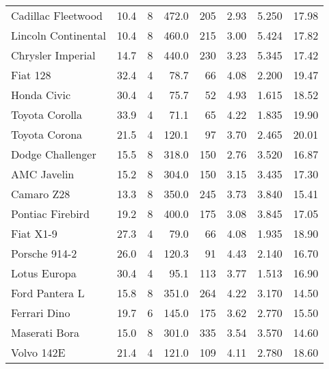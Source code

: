\documentclass[]{book}
\begin{document}
\begin{ThreePartTable}
\begin{longtable}{lrrrrrrr}
Cadillac Fleetwood & 10.4 & 8 & 472.0 & 205 & 2.93 & 5.250 & 17.98\\
Lincoln Continental & 10.4 & 8 & 460.0 & 215 & 3.00 & 5.424 & 17.82\\
Chrysler Imperial & 14.7 & 8 & 440.0 & 230 & 3.23 & 5.345 & 17.42\\
Fiat 128 & 32.4 & 4 & 78.7 & 66 & 4.08 & 2.200 & 19.47\\
\midrule
Honda Civic & 30.4 & 4 & 75.7 & 52 & 4.93 & 1.615 & 18.52\\
Toyota Corolla & 33.9 & 4 & 71.1 & 65 & 4.22 & 1.835 & 19.90\\
Toyota Corona & 21.5 & 4 & 120.1 & 97 & 3.70 & 2.465 & 20.01\\
Dodge Challenger & 15.5 & 8 & 318.0 & 150 & 2.76 & 3.520 & 16.87\\
AMC Javelin & 15.2 & 8 & 304.0 & 150 & 3.15 & 3.435 & 17.30\\
Camaro Z28 & 13.3 & 8 & 350.0 & 245 & 3.73 & 3.840 & 15.41\\
\midrule
Pontiac Firebird & 19.2 & 8 & 400.0 & 175 & 3.08 & 3.845 & 17.05\\
Fiat X1-9 & 27.3 & 4 & 79.0 & 66 & 4.08 & 1.935 & 18.90\\
Porsche 914-2 & 26.0 & 4 & 120.3 & 91 & 4.43 & 2.140 & 16.70\\
Lotus Europa & 30.4 & 4 & 95.1 & 113 & 3.77 & 1.513 & 16.90\\
Ford Pantera L & 15.8 & 8 & 351.0 & 264 & 4.22 & 3.170 & 14.50\\
Ferrari Dino & 19.7 & 6 & 145.0 & 175 & 3.62 & 2.770 & 15.50\\
\midrule
Maserati Bora & 15.0 & 8 & 301.0 & 335 & 3.54 & 3.570 & 14.60\\
Volvo 142E & 21.4 & 4 & 121.0 & 109 & 4.11 & 2.780 & 18.60\\*
\end{longtable}
\end{ThreePartTable}
\end{document}
